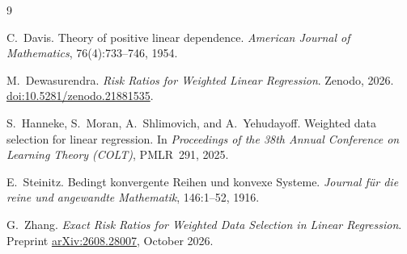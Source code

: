 \documentclass[11pt]{article}
\theoremstyle{plain}
\theoremstyle{definition}
\theoremstyle{remark}
\begin{document}
\begin{thebibliography}{9}

C.~Davis.
Theory of positive linear dependence.
\emph{American Journal of Mathematics}, 76(4):733--746, 1954.

M.~Dewasurendra.
\emph{Risk Ratios for Weighted Linear Regression}.
Zenodo, 2026. \href{https://doi.org/10.5281/zenodo.21881535}{doi:10.5281/zenodo.21881535}.

S.~Hanneke, S.~Moran, A.~Shlimovich, and A.~Yehudayoff.
Weighted data selection for linear regression.
In \emph{Proceedings of the 38th Annual Conference on Learning Theory (COLT)}, PMLR~291, 2025.

E.~Steinitz.
Bedingt konvergente Reihen und konvexe Systeme.
\emph{Journal f\"ur die reine und angewandte Mathematik}, 146:1--52, 1916.

G.~Zhang.
\emph{Exact Risk Ratios for Weighted Data Selection in Linear Regression}.
Preprint \href{https://arxiv.org/abs/2608.28007}{arXiv:2608.28007}, October 2026.

\end{thebibliography}
\end{document}

